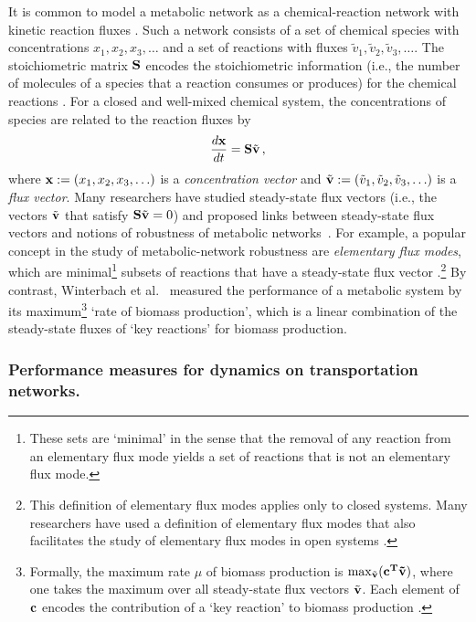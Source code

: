 \documentclass{comnet-mod}
\begin{document}
It is common to model a metabolic network as a chemical-reaction network with kinetic reaction fluxes \cite{Larhlimi2011}. Such a network consists of a set of chemical species with concentrations $x_1, x_2, x_3,\ldots$ and a set of reactions with fluxes $\tilde v_1, \tilde v_2, \tilde v_3, \ldots$. The stoichiometric matrix ${\bf S}$ encodes the stoichiometric information  (i.e., the number of molecules of a species that a reaction consumes or produces) for the chemical reactions \cite{Larhlimi2011}. For a closed and well-mixed chemical system, the concentrations of species are related to the reaction fluxes by
\begin{align}
	\frac{d{\bf x}}{dt}={\bf S}\tilde{\bf v}\,,\nonumber
\end{align}
where ${\bf x}:= (x_1, x_2, x_3,\ldots)$ is a \textit{concentration vector} and ${\tilde{\bf v}}:=(\tilde v_1, \tilde v_2, \tilde v_3, \ldots)$ is a \textit{flux vector}. Many researchers have studied steady-state flux vectors (i.e., the vectors $\tilde{\bf v}$ that satisfy ${\bf S}\tilde{\bf v} = 0$) and proposed links between steady-state flux vectors and notions of robustness of metabolic networks~\cite{Wilhelm2004, Behre2008, Winterbach2011}. For example, a popular concept in the study of metabolic-network robustness are \textit{elementary flux modes}, which are minimal\footnote{These sets are `minimal' in the sense that the removal of any reaction from an elementary flux mode yields a set of reactions that is not an elementary flux mode.} subsets of reactions that have a steady-state flux vector \cite{Wilhelm2004, Behre2008}.\footnote{This definition of elementary flux modes applies only to closed systems. Many researchers have used a definition of elementary flux modes that also facilitates the study of elementary flux modes in open systems \cite{Schuster2000, Zanghellini2013}.} By contrast, Winterbach et al.~\cite{Winterbach2011} measured the performance of a metabolic system by its maximum\footnote{Formally, the maximum rate $\mu$ of biomass production is $\max_{\tilde{\bf v}}(\bf{c}^T\tilde{\bf v})$, where one takes the maximum over all steady-state flux vectors $\tilde{\bf v}$. Each element of $\bf c$ encodes the contribution of a `key reaction' to biomass production \cite{Winterbach2011}.} `rate of biomass production', which is a linear combination of the steady-state fluxes of `key reactions' for biomass production. 


\subsubsection{Performance measures for dynamics on transportation networks.}
\end{document}
